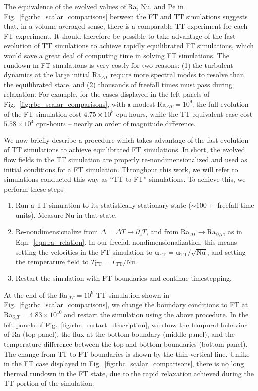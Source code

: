 \documentclass[aps, pre, onecolumn, nofootinbib, notitlepage, groupedaddress, amsfonts, amssymb, amsmath, longbibliography, superscriptaddress]{revtex4-1}
\begin{document}
The equivalence of the evolved values of Ra, Nu, and Pe in Fig.~\ref{fig:rbc_scalar_comparisons} between the FT and TT simulations suggests that, in a volume-averaged sense, there is a comparable TT experiment for each FT experiment.
It should therefore be possible to take advantage of the fast evolution of TT simulations to achieve rapidly equilibrated FT simulations, which would save a great deal of computing time in solving FT simulations.
The rundown in FT simulations is very costly for two reasons: (1) the turbulent dynamics at the large initial Ra$_{\Delta T}$ require more spectral modes to resolve than the equilibrated state, and (2) thousands of freefall times must pass during relaxation.
For example, for the cases displayed in the left panels of Fig.~\ref{fig:rbc_scalar_comparisons}, with a modest Ra$_{\Delta T} = 10^9$, the full evolution of the FT simulation cost $4.75 \times 10^5$ cpu-hours, while the TT equivalent case cost $5.58 \times 10^4$ cpu-hours -- nearly an order of magnitude difference.

We now briefly describe a procedure which takes advantage of the fast evolution of TT simulations to achieve equilibrated FT simulations.
In short, the evolved flow fields in the TT simulation are properly re-nondimensionalized and used as initial conditions for a FT simulation.
Throughout this work, we will refer to simulations conducted this way as ``TT-to-FT'' simulations.
To achieve this, we perform these steps:
\begin{enumerate}
\item Run a TT simulation to its statistically stationary state ($\sim100+$ freefall time units). 
Measure $\text{Nu}$ in that state.
\item Re-nondimensionalize from $\Delta = \Delta T \rightarrow \partial_z T$, and from Ra$_{\Delta T}\rightarrow$Ra$_{\partial_z T}$, as in Eqn.~\ref{eqn:ra_relation}.
In our freefall nondimensionalization, this means setting the velocities in the FT simulation to $\bm{u}_{\text{FT}} = \bm{u}_{\text{TT}} / \sqrt{\text{Nu}}$, and setting the temperature field to $T_{\text{FT}} = T_{\text{TT}} / \text{Nu}$.
\item Restart the simulation with FT boundaries and continue timestepping.
\end{enumerate}
At the end of the Ra$_{\Delta T} = 10^9$ TT simulation shown in Fig.~\ref{fig:rbc_scalar_comparisons}, we change the boundary conditions to FT at Ra$_{\partial_z T} = 4.83\times 10^{10}$ and restart the simulation using the above procedure.
In the left panels of Fig.~\ref{fig:rbc_restart_description}, we show the temporal behavior of Ra (top panel), the flux at the bottom boundary (middle panel), and the temperature difference between the top and bottom boundaries (bottom panel).
The change from TT to FT boundaries is shown by the thin vertical line.
Unlike in the FT case displayed in Fig.~\ref{fig:rbc_scalar_comparisons}, there is no long thermal rundown in the FT state, due to the rapid relaxation achieved during the TT portion of the simulation.
\end{document}
